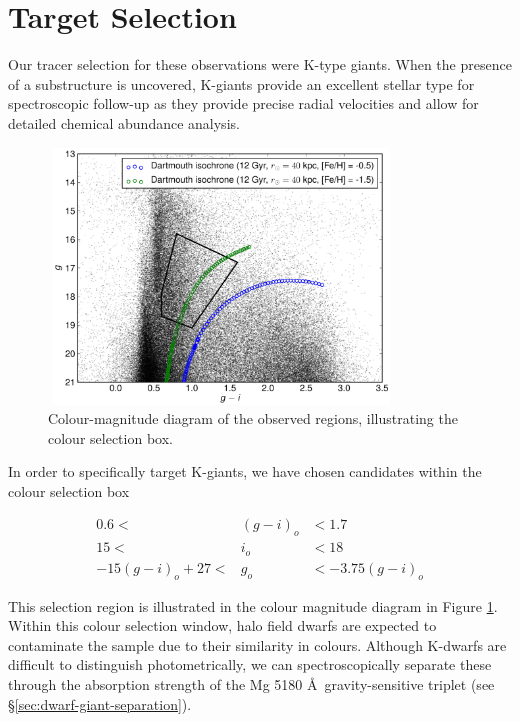 \documentclass{emulateapj}
\begin{document}
	\section{Target Selection}
	\label{sec:target-selection}
	
	Our tracer selection for these observations were K-type giants. When the presence of a substructure  is uncovered, K-giants provide an excellent stellar type for spectroscopic follow-up as they provide precise radial velocities and allow for detailed chemical abundance analysis. 
	
\begin{figure}[h!]
	\centering
	\includegraphics[width=9.2cm,height=6.8cm]{./figures/cmd.eps}
	\caption{Colour-magnitude diagram of the observed regions, illustrating the colour selection box.}
	\label{fig:cmd-target-selection}
\end{figure}

\noindent In order to specifically target K-giants, we have chosen candidates within the colour selection box
	
	\begin{eqnarray}
				0.6 <& (g-i)_o &< 1.7 \nonumber \\
				15 <& i_o &< 18 \\
		-15(g-i)_o + 27 <& g_o &< -3.75(g-i)_o \nonumber
	\end{eqnarray}
	
	
This selection region is illustrated in the colour magnitude diagram in Figure \ref{fig:cmd-target-selection}. Within this colour selection window, halo field dwarfs are expected to contaminate the sample due to their similarity in colours. Although K-dwarfs are difficult to distinguish photometrically, we can spectroscopically separate these through the absorption strength of the Mg 5180 \AA\, gravity-sensitive triplet (see \S\ref{sec:dwarf-giant-separation}).
\end{document}
